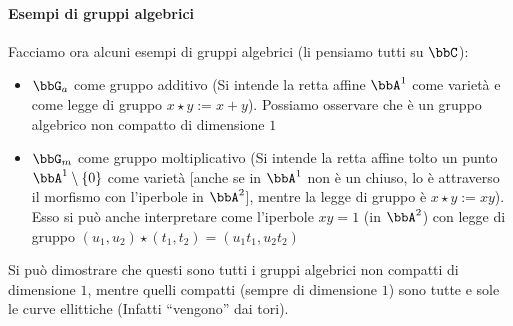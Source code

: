 \paragraph{Esempi di gruppi algebrici} Facciamo ora alcuni esempi di gruppi algebrici (li pensiamo tutti su $\bbC$):
\begin{itemize}
\item $\bbG_a$ come gruppo additivo (Si intende la retta affine $\bbA^1$ come varietà e come legge di gruppo $x \star y := x + y$). Possiamo
  osservare che è un gruppo algebrico non compatto di dimensione $1$
\item $\bbG_m$ come gruppo moltiplicativo (Si intende la retta affine tolto un punto $\bbA^1 \setminus \{ 0 \}$ come varietà [anche se in
  $\bbA^1$ non è un chiuso, lo è attraverso il morfismo con l'iperbole in $\bbA^2$], mentre la legge di gruppo è $x \star y := x y$). \\
  Esso si può anche interpretare come l'iperbole $xy=1$ (in $\bbA^2$) con legge di gruppo $(u_1, u_2) \star (t_1, t_2) = (u_1 t_1, u_2 t_2)$
\end{itemize}

Si può dimostrare che questi sono tutti i gruppi algebrici non compatti di dimensione $1$, mentre quelli compatti (sempre di dimensione $1$)
sono tutte e sole le curve ellittiche (Infatti ``vengono'' dai tori).


